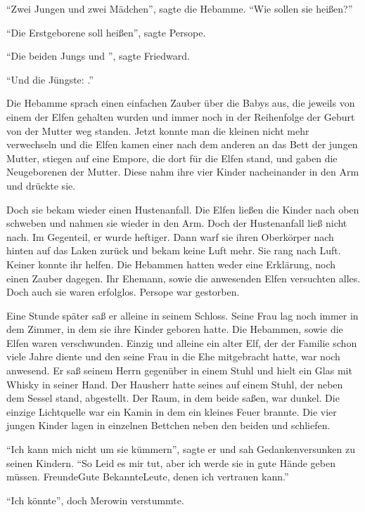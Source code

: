 \enquote{Zwei Jungen und zwei Mädchen}, sagte die Hebamme. \enquote{Wie sollen sie heißen?}

\enquote{Die Erstgeborene soll  heißen}, sagte Persope.

\enquote{Die beiden Jungs  und }, sagte Friedward.

\enquote{Und die Jüngste: .}

Die Hebamme sprach einen einfachen Zauber über die Babys aus, die jeweils von einem der Elfen gehalten wurden und immer noch in der Reihenfolge der Geburt von der Mutter weg standen. Jetzt konnte man die kleinen nicht mehr verwechseln und die Elfen kamen einer nach dem anderen an das Bett der jungen Mutter, stiegen auf eine Empore, die dort für die Elfen stand, und gaben die Neugeborenen der Mutter. Diese nahm ihre vier Kinder nacheinander in den Arm und drückte sie.

Doch sie bekam wieder einen Hustenanfall. Die Elfen ließen die Kinder nach oben schweben und nahmen sie wieder in den Arm. Doch der Hustenanfall ließ nicht nach. Im Gegenteil, er wurde heftiger. Dann warf sie ihren Oberkörper nach hinten auf das Laken zurück und bekam keine Luft mehr. Sie rang nach Luft. Keiner konnte ihr helfen. Die Hebammen hatten weder eine Erklärung, noch einen Zauber dagegen. Ihr Ehemann, sowie die anwesenden Elfen versuchten alles. Doch auch sie waren erfolglos. Persope war gestorben.

Eine Stunde später saß er alleine in seinem Schloss. Seine Frau lag noch immer in dem Zimmer, in dem sie ihre Kinder geboren hatte. Die Hebammen, sowie die Elfen waren verschwunden. Einzig und alleine ein alter Elf, der der Familie schon viele Jahre diente und den seine Frau in die Ehe mitgebracht hatte, war noch anwesend. Er saß seinem Herrn gegenüber in einem Stuhl und hielt ein Glas mit Whisky in seiner Hand. Der Hausherr hatte seines auf einem Stuhl, der neben dem Sessel stand, abgestellt. Der Raum, in dem beide saßen, war dunkel. Die einzige Lichtquelle war ein Kamin in dem ein kleines Feuer brannte. Die vier jungen Kinder lagen in einzelnen Bettchen neben den beiden und schliefen.

\enquote{Ich kann mich nicht um sie kümmern}, sagte er und sah Gedankenversunken zu seinen Kindern. \enquote{So Leid es mir tut, aber ich werde sie in gute Hände geben müssen. Freunde\abs Gute Bekannte\abs Leute, denen ich vertrauen kann.}

\enquote{Ich könnte\abs}, doch Merowin verstummte.

